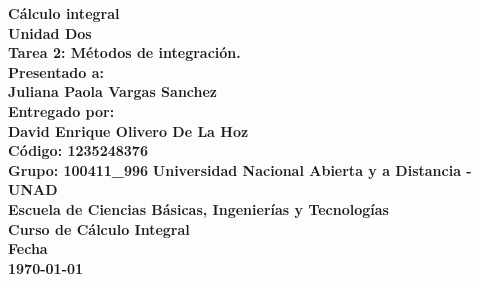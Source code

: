 \begin{titlepage}
    \begin{center}
        \textbf{Cálculo integral\\}
        \vspace*{2cm}
        \textbf{
            Unidad Dos\\
            Tarea 2: Métodos de integración.\\
        }
        \vspace*{1cm}
        \textbf{
            Presentado a:\\
            Juliana Paola Vargas Sanchez\\
        }
        \vspace*{1cm}
        \textbf{Entregado por:\\}
        \vspace*{1cm}
        \textbf{
            David Enrique Olivero De La Hoz\\
            Código: 1235248376\\
            Grupo: 100411\_996
        }
        \vspace*{8cm}
        \textbf{
            Universidad Nacional Abierta y a Distancia - UNAD\\
            Escuela de Ciencias Básicas, Ingenierías y Tecnologías\\ 
            Curso de Cálculo Integral\\ 
            Fecha\\
            \today
        }
    \end{center}
\end{titlepage}